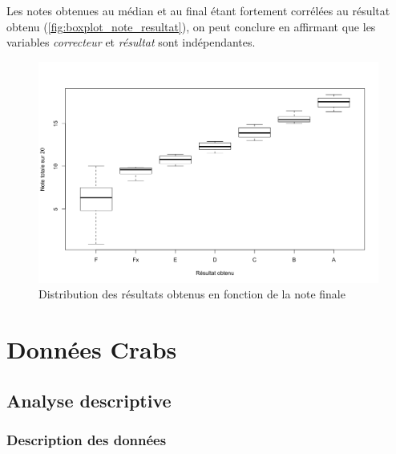 \documentclass[a4paper,11pt]{report}
\begin{document}
Les notes obtenues au médian et au final étant fortement corrélées au résultat obtenu (\autoref{fig:boxplot_note_resultat}), on peut conclure en affirmant que les variables \textit{correcteur} et \textit{résultat} sont indépendantes.

\begin{figure}[H]
	\centering
	\captionsetup{justification=centering, margin=4cm}
	\includegraphics[width=.5\linewidth]{img/1-1-2-Boxplot-note-resultat}
	\caption{\scriptsize Distribution des résultats obtenus en fonction de la note finale}
	\label{fig:boxplot_note_resultat}
\end{figure}

\section{Données Crabs}

\subsection{Analyse descriptive}

\subsubsection{Description des données}
\end{document}

